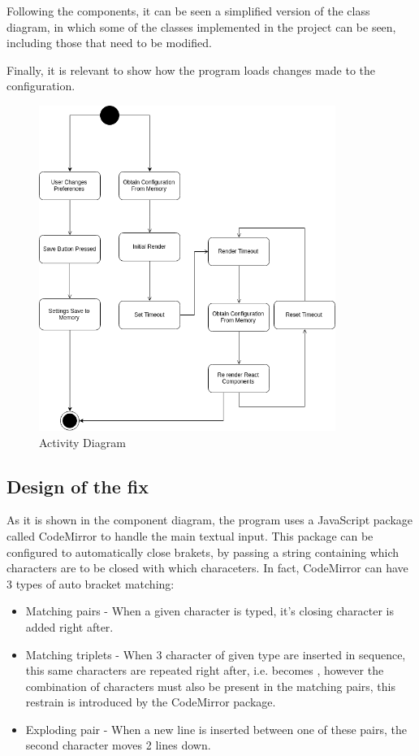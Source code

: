Following the components, it can be seen a simplified version of the
class diagram, in which some of the classes implemented in the project
can be seen, including those that need to be modified.

Finally, it is relevant to show how the program loads changes made to
the configuration.

\begin{figure}
\centering
\includegraphics[height=4.16667in]{../activityDiagram.png}
\caption{Activity Diagram}
\end{figure}

\subsection{Design of the fix}\label{design-of-the-fix}

As it is shown in the component diagram, the program uses a JavaScript
package called CodeMirror to handle the main textual input. This package
can be configured to automatically close brakets, by passing a string
containing which characters are to be closed with which characeters. In
fact, CodeMirror can have 3 types of auto bracket matching:

\begin{itemize}
\item
  Matching pairs - When a given character is typed, it's closing
  character is added right after.
\item
  Matching triplets - When 3 character of given type are inserted in
  sequence, this same characters are repeated right after, i.e.
  \texttt{\textquotesingle{}\textquotesingle{}\textquotesingle{}}
  becomes
  \texttt{\textquotesingle{}\textquotesingle{}\textquotesingle{}\textquotesingle{}\textquotesingle{}\textquotesingle{}},
  however the combination of characters must also be present in the
  matching pairs, this restrain is introduced by the CodeMirror package.
\item
  Exploding pair - When a new line is inserted between one of these
  pairs, the second character moves 2 lines down.
\end{itemize}

